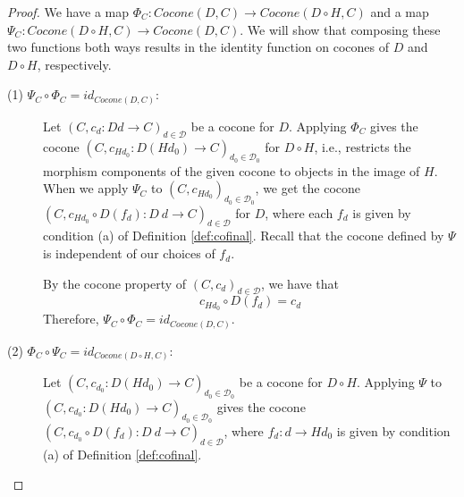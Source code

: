 \documentclass{msthesis}
\theoremstyle{definition}
\newcommand{\mcD}{\mathcal{D}}
\newcommand{\mcDo}{\mathcal{D}_0}
\begin{document}
\begin{proof}
    We have a map $\Phi_C : Cocone(D, C) \to Cocone(D \circ H, C)$ and a map $\Psi_C : Cocone(D \circ H, C) \to Cocone(D, C)$.  We will show that composing these two functions both ways results in the identity function on cocones of $D$ and $D \circ H$, respectively.
    \begin{description}
        \item[(1) $\Psi_C \circ \Phi_C = id_{Cocone(D, C)}$: ]
        Let $(C, c_{d} : D d \to C)_{d \in \mcD}$ be a cocone for $D$.  Applying $\Phi_C$ gives the cocone $(C, c_{H d_0} : D(H d_0) \to C)_{d_0 \in \mcDo}$ for $D \circ H$, i.e., restricts the morphism components of the given cocone to objects in the image of $H$.  When we apply $\Psi_C$ to $(C, c_{H d_0})_{d_0 \in \mcDo}$, we get the cocone $(C, c_{Hd_0} \circ D(f_d) : D\ d \to C)_{d \in \mcD}$ for $D$, where each $f_d$ is given by condition (a) of Definition \ref{def:cofinal}.  Recall that the cocone defined by $\Psi$ is independent of our choices of $f_d$.

        By the cocone property of $(C, c_{d})_{d \in \mcD}$, we have that
        \[ c_{H d_0} \circ D(f_d) = c_d \]
        Therefore, $\Psi_C \circ \Phi_C = id_{Cocone(D, C)}$.

        \item[(2) $\Phi_C \circ \Psi_C = id_{Cocone(D \circ H, C)}$: ]
        Let $(C, c_{d_0} : D(H d_0) \to C)_{d_0 \in \mcDo}$ be a cocone for $D \circ H$.  Applying $\Psi$ to $(C, c_{d_0} : D(H d_0) \to C)_{d_0 \in \mcDo}$ gives the cocone $(C, c_{d_0} \circ D(f_d) : D\ d \to C)_{d \in \mcD}$, where $f_d : d \to H d_0$ is given by condition (a) of Definition \ref{def:cofinal}. 

        

\end{description}
\end{proof}
\end{document}
